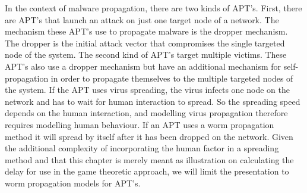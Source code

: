In the context of malware propagation, there are two kinds of APT's. First, there are APT's that launch an attack on just one target node of a network. The mechanism these APT's use to propagate malware is the dropper mechanism. The dropper is the initial attack vector that compromises the single targeted node of the system. The second kind of APT's target multiple victims. These APT's also use a dropper mechanism but have an additional mechanism for self-propagation in order to propagate themselves to the multiple targeted nodes of the system. If the APT uses virus spreading, the virus infects one node on the network and has to wait for human interaction to spread. So the spreading speed depends on the human interaction, and modelling virus propagation therefore requires modelling human behaviour. If an APT uses a worm propagation method it will spread by itself after it has been dropped on the network. Given the additional complexity of incorporating the human factor in a spreading method and that this chapter is merely meant as illustration on calculating the delay for use in the game theoretic approach, we will limit the presentation to worm propagation models for APT's. \\

